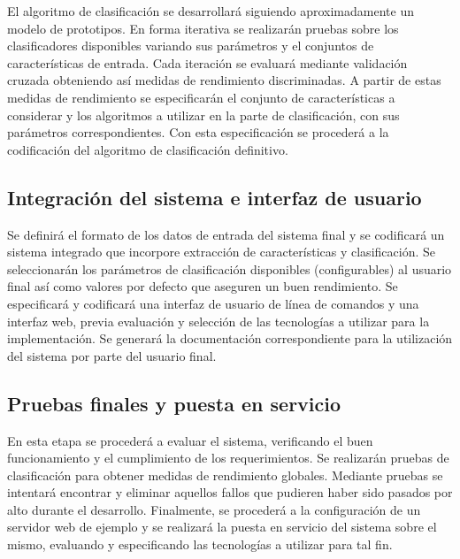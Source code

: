 \documentclass[12pt,bibliography=oldstyle,DIV=12,parskip=full-]{scrartcl}
\begin{document}
El algoritmo de clasificación se desarrollará siguiendo
aproximadamente un modelo de prototipos. En forma iterativa se
realizarán pruebas sobre los clasificadores disponibles variando sus
parámetros y el conjuntos de características de entrada. Cada
iteración se evaluará mediante validación cruzada obteniendo así
medidas de rendimiento discriminadas. A partir de estas medidas de
rendimiento se especificarán el conjunto de características a
considerar y los algoritmos a utilizar en la parte de clasificación,
con sus parámetros correspondientes. Con esta especificación se procederá
a la codificación del algoritmo de clasificación definitivo.
%
%
\subsection{Integración del sistema e interfaz de usuario}
Se definirá el formato de los datos de entrada del sistema final y se
codificará un sistema integrado que incorpore extracción de
características y clasificación. Se seleccionarán los parámetros de
clasificación disponibles (configurables) al usuario final así como
valores por defecto que aseguren un buen rendimiento.
%
Se especificará y codificará una interfaz de usuario de línea de
comandos y una interfaz web, previa evaluación y selección de las
tecnologías a utilizar para la implementación.  Se generará la
documentación correspondiente para la utilización del sistema por
parte del usuario final.
%
\subsection{Pruebas finales y puesta en servicio}
En esta etapa se procederá a evaluar el sistema, verificando el buen
funcionamiento y el cumplimiento de los requerimientos. Se realizarán
pruebas de clasificación para obtener medidas de rendimiento
globales. Mediante pruebas se intentará encontrar y eliminar
aquellos fallos que pudieren haber sido pasados por alto durante el
desarrollo.
%
Finalmente, se procederá a la configuración de un servidor web de
ejemplo y se realizará la puesta en servicio del sistema sobre el
mismo, evaluando y especificando las tecnologías a utilizar para tal
fin.
%
%
\newpage
\end{document}
